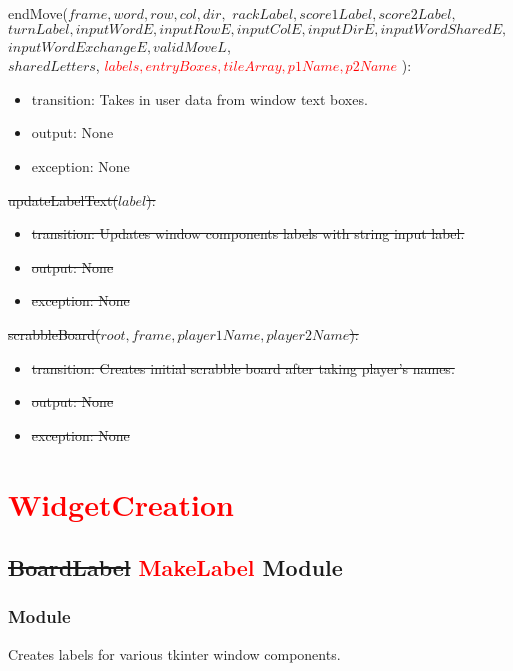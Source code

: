 \documentclass[12pt]{article}
\begin{document}
\noindent endMove($frame, word, row, col, dir,$ \sout{$rackLabel, score1Label, score2Label,$} \\ \sout{$turnLabel, inputWordE, inputRowE, inputColE, inputDirE, inputWordSharedE,$} \\ \sout{$inputWordExchangeE, validMoveL$},\\ 
$sharedLetters$, \textcolor{red}{$labels, entryBoxes, tileArray, p1Name, p2Name$} ):
\begin{itemize}
\item transition: Takes in user data from window text boxes.
\item output: None
\item exception: None
\end{itemize}

\noindent \sout{updateLabelText($label$):}
\begin{itemize}
\item \sout{transition: Updates window components labels with string input label.}
\item \sout{output: None}
\item \sout{exception: None}
\end{itemize}

\noindent \sout{scrabbleBoard($root, frame, player1Name, player2Name$):}
\begin{itemize}
\item \sout{transition: Creates initial scrabble board after taking player's names.}
\item \sout{output: None}
\item \sout{exception: None}
\end{itemize}

\newpage

\section*{\textcolor{red}{WidgetCreation}}

\subsection*{\sout{BoardLabel} \textcolor{red}{MakeLabel} Module}

\subsubsection*{Module}

Creates labels for various tkinter window components.
\end{document}
